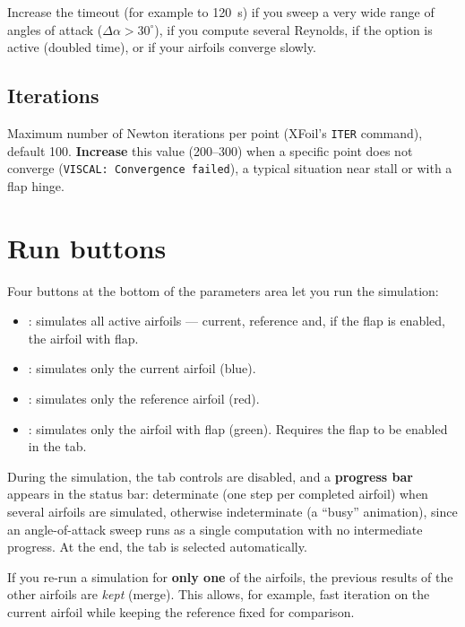 \begin{attention}
Increase the timeout (for example to 120~s) if you sweep a
very wide range of angles of attack ($\Delta \alpha > 30^\circ$), if you
compute several Reynolds, if the  option
is active (doubled time), or if your airfoils converge slowly.
\end{attention}

\subsection{Iterations}

Maximum number of Newton iterations per point (XFoil's
\texttt{ITER} command), default 100. \textbf{Increase} this
value (200--300) when a specific point does not converge
(\texttt{VISCAL: Convergence failed}), a typical situation near
stall or with a flap hinge.

\section{Run buttons}

Four buttons at the bottom of the parameters area let you run
the simulation:

\begin{itemize}
    \item {}: simulates all active airfoils ---
        current, reference and, if the flap is enabled, the airfoil
        with flap.
    \item {}: simulates only the current airfoil
        (blue).
    \item {}: simulates only the reference
        airfoil (red).
    \item {}: simulates only the airfoil with flap
        (green). Requires the flap to be enabled in the
         tab.
\end{itemize}

During the simulation, the tab controls are disabled, and a
\textbf{progress bar} appears in the status bar: determinate (one
step per completed airfoil) when several airfoils are simulated,
otherwise indeterminate (a ``busy'' animation), since an
angle-of-attack sweep runs as a single computation with no
intermediate progress. At the end, the  tab is
selected automatically.

\begin{important}
If you re-run a simulation for \textbf{only one} of the airfoils,
the previous results of the other airfoils are \emph{kept}
(merge). This allows, for example, fast iteration on the current
airfoil while keeping the reference fixed for comparison.
\end{important}

